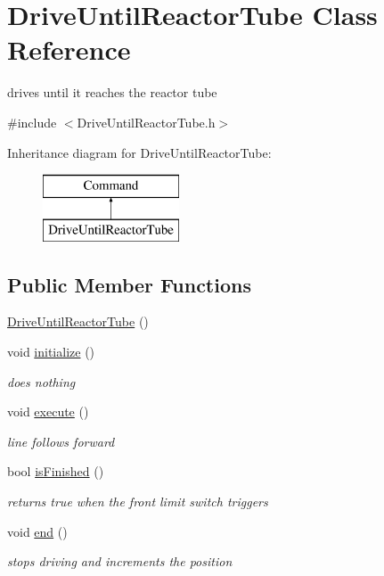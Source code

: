 \hypertarget{classDriveUntilReactorTube}{\section{Drive\-Until\-Reactor\-Tube Class Reference}
\label{classDriveUntilReactorTube}
}


drives until it reaches the reactor tube  




{\ttfamily \#include $<$Drive\-Until\-Reactor\-Tube.\-h$>$}

Inheritance diagram for Drive\-Until\-Reactor\-Tube\-:\begin{figure}[H]
\begin{center}
\leavevmode
\includegraphics[height=2.000000cm]{classDriveUntilReactorTube}
\end{center}
\end{figure}
\subsection*{Public Member Functions}
\begin{DoxyCompactItemize}
\item 
\hyperlink{classDriveUntilReactorTube_acc0fbd9b892ddd9b0745fe5d14f050dd}{Drive\-Until\-Reactor\-Tube} ()
\item 
void \hyperlink{classDriveUntilReactorTube_af0c43c271f20406266ed1423bf6d980d}{initialize} ()
\begin{DoxyCompactList}\small\item\em does nothing \end{DoxyCompactList}\item 
void \hyperlink{classDriveUntilReactorTube_a8d2c383dcf8e2424113cd6e546b58870}{execute} ()
\begin{DoxyCompactList}\small\item\em line follows forward \end{DoxyCompactList}\item 
bool \hyperlink{classDriveUntilReactorTube_ab22da4688ca46cc3e33b1a7aca879a74}{is\-Finished} ()
\begin{DoxyCompactList}\small\item\em returns true when the front limit switch triggers \end{DoxyCompactList}\item 
void \hyperlink{classDriveUntilReactorTube_a34011a5721faf7cd169ac4e56f9c901b}{end} ()
\begin{DoxyCompactList}\small\item\em stops driving and increments the position \end{DoxyCompactList}\end{DoxyCompactItemize}
